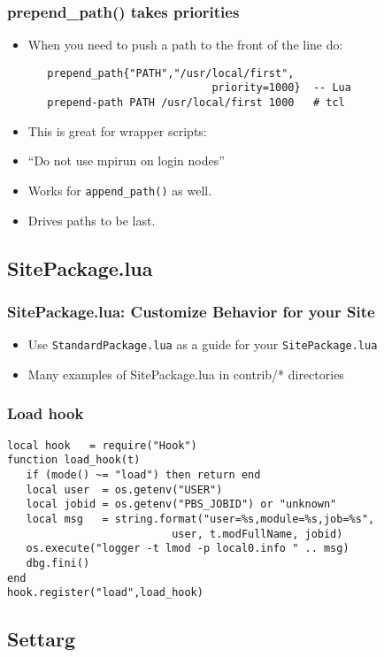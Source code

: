\documentclass{beamer}
\begin{document}
\begin{frame}[fragile]
    \frametitle{prepend\_path() takes priorities}
  \begin{itemize}
    \item When you need to push a path to the front of the line do:
    {\small
\begin{verbatim}
   prepend_path{"PATH","/usr/local/first",
                             priority=1000}  -- Lua
   prepend-path PATH /usr/local/first 1000   # tcl
\end{verbatim}
}
    \item This is great for wrapper scripts:
    \item ``Do not use mpirun on login nodes''
    \item Works for \texttt{append\_path()} as well.
    \item Drives paths to be last.
  \end{itemize}
\end{frame}

\subsection{SitePackage.lua}
\label{sec:sitePackage}

\begin{frame}[fragile]
    \frametitle{SitePackage.lua: Customize Behavior for your Site}
  \begin{itemize}
    \item Use \texttt{StandardPackage.lua} as a guide for your \texttt{SitePackage.lua}
    \item Many examples of SitePackage.lua in contrib/* directories
  \end{itemize}
\end{frame}

\begin{frame}[fragile]
    \frametitle{Load hook}
    {\small
\begin{verbatim}
local hook   = require("Hook")
function load_hook(t)
   if (mode() ~= "load") then return end
   local user  = os.getenv("USER")
   local jobid = os.getenv("PBS_JOBID") or "unknown"
   local msg   = string.format("user=%s,module=%s,job=%s",
                          user, t.modFullName, jobid)
   os.execute("logger -t lmod -p local0.info " .. msg)
   dbg.fini()
end
hook.register("load",load_hook)
\end{verbatim}
}
\end{frame}

\subsection{Settarg}
\label{sec:sitePackage}
\end{document}
